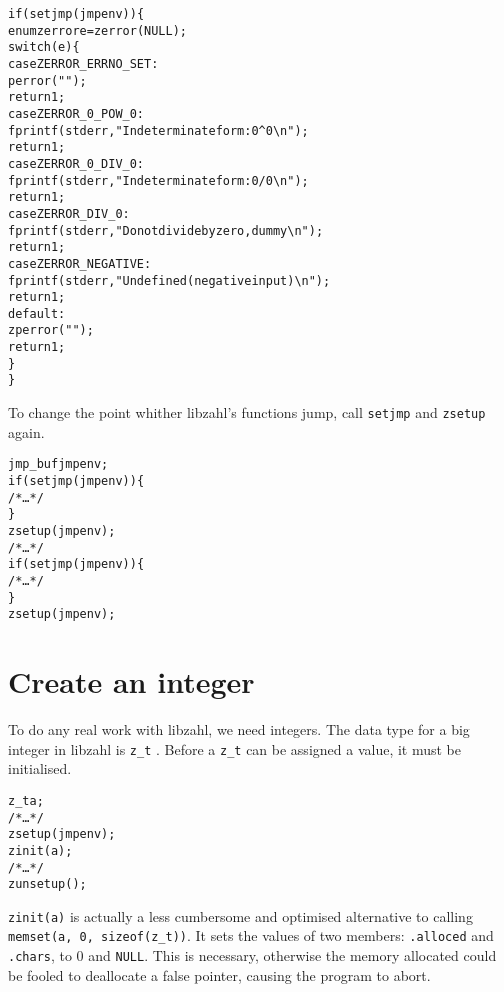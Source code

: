 \begin{alltt}
   \textcolor{c}{if (setjmp(jmpenv)) \{}
       enum zerror e = zerror(NULL);
       switch (e) \{
       case ZERROR_ERRNO_SET:
           perror("");
           \textcolor{c}{return 1;}
       case ZERROR_0_POW_0:
           fprintf(stderr, "Indeterminate form: 0^0\verb|\|n");
           \textcolor{c}{return 1;}
       case ZERROR_0_DIV_0:
           fprintf(stderr, "Indeterminate form: 0/0\verb|\|n");
           \textcolor{c}{return 1;}
       case ZERROR_DIV_0:
           fprintf(stderr, "Do not divide by zero, dummy\verb|\|n");
           \textcolor{c}{return 1;}
       case ZERROR_NEGATIVE:
           fprintf(stderr, "Undefined (negative input)\verb|\|n");
           \textcolor{c}{return 1;}
       default:
           zperror("");
           \textcolor{c}{return 1;}
       \}
   \textcolor{c}{\}}
\end{alltt}

To change the point whither libzahl's functions
jump, call {\tt setjmp} and {\tt zsetup} again.

\begin{alltt}
   jmp_buf jmpenv;
   if (setjmp(jmpenv)) \{
       \textcolor{c}{/* \textrm{\ldots} */}
   \}
   zsetup(jmpenv);
   \textcolor{c}{/* \textrm{\ldots} */}
   if (setjmp(jmpenv)) \{
       \textcolor{c}{/* \textrm{\ldots} */}
   \}
   zsetup(jmpenv);
\end{alltt}


\newpage
\section{Create an integer}
\label{sec:Create an integer}

To do any real work with libzahl, we need integers. The
data type for a big integer in libzahl is {\tt z\_t}
. Before a {\tt z\_t}
can be assigned a value, it must be initialised.

\begin{alltt}
   z_t a;
   \textcolor{c}{/* \textrm{\ldots} */
   zsetup(jmpenv);}
   zinit(a);
   \textcolor{c}{/* \textrm{\ldots} */
   zunsetup();}
\end{alltt}

\noindent
{\tt zinit(a)} is actually a less cumbersome and optimised
alternative to calling {\tt memset(a, 0, sizeof(z\_t))}.
It sets the values of two members: {\tt .alloced} and
{\tt .chars}, to 0 and {\tt NULL}. This is necessary,
otherwise the memory allocated could be fooled to deallocate
a false pointer, causing the program to abort.

